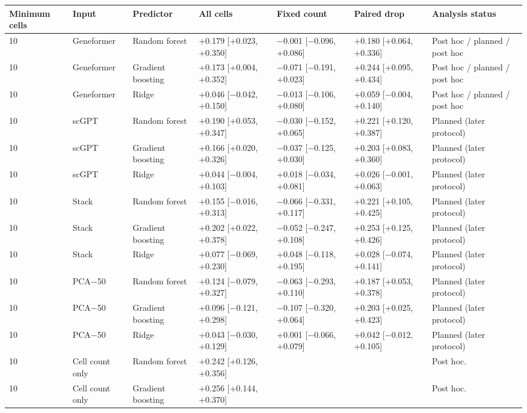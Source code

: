 \begin{tabular}{lllllll}
\toprule
Minimum cells & Input & Predictor & All cells & Fixed count & Paired drop & Analysis status \\
\midrule
10 & Geneformer & Random forest & +0.179 [+0.023, +0.350] & $-$0.001 [$-$0.096, +0.086] & +0.180 [+0.064, +0.336] & Post hoc / planned / post hoc \\
10 & Geneformer & Gradient boosting & +0.173 [+0.004, +0.352] & $-$0.071 [$-$0.191, +0.023] & +0.244 [+0.095, +0.434] & Post hoc / planned / post hoc \\
10 & Geneformer & Ridge & +0.046 [$-$0.042, +0.150] & $-$0.013 [$-$0.106, +0.080] & +0.059 [$-$0.004, +0.140] & Post hoc / planned / post hoc \\
10 & scGPT & Random forest & +0.190 [+0.053, +0.347] & $-$0.030 [$-$0.152, +0.065] & +0.221 [+0.120, +0.387] & Planned (later protocol) \\
10 & scGPT & Gradient boosting & +0.166 [+0.020, +0.326] & $-$0.037 [$-$0.125, +0.030] & +0.203 [+0.083, +0.360] & Planned (later protocol) \\
10 & scGPT & Ridge & +0.044 [$-$0.004, +0.103] & +0.018 [$-$0.034, +0.081] & +0.026 [$-$0.001, +0.063] & Planned (later protocol) \\
10 & Stack & Random forest & +0.155 [$-$0.016, +0.313] & $-$0.066 [$-$0.331, +0.117] & +0.221 [+0.105, +0.425] & Planned (later protocol) \\
10 & Stack & Gradient boosting & +0.202 [+0.022, +0.378] & $-$0.052 [$-$0.247, +0.108] & +0.253 [+0.125, +0.426] & Planned (later protocol) \\
10 & Stack & Ridge & +0.077 [$-$0.069, +0.230] & +0.048 [$-$0.118, +0.195] & +0.028 [$-$0.074, +0.141] & Planned (later protocol) \\
10 & PCA$-$50 & Random forest & +0.124 [$-$0.079, +0.327] & $-$0.063 [$-$0.293, +0.110] & +0.187 [+0.053, +0.378] & Planned (later protocol) \\
10 & PCA$-$50 & Gradient boosting & +0.096 [$-$0.121, +0.298] & $-$0.107 [$-$0.320, +0.064] & +0.203 [+0.025, +0.423] & Planned (later protocol) \\
10 & PCA$-$50 & Ridge & +0.043 [$-$0.030, +0.129] & +0.001 [$-$0.066, +0.079] & +0.042 [$-$0.012, +0.105] & Planned (later protocol) \\
10 & Cell count only & Random forest & +0.242 [+0.126, +0.356] &  &  & Post hoc. \\
10 & Cell count only & Gradient boosting & +0.256 [+0.144, +0.370] &  &  & Post hoc. \\

\end{tabular}

